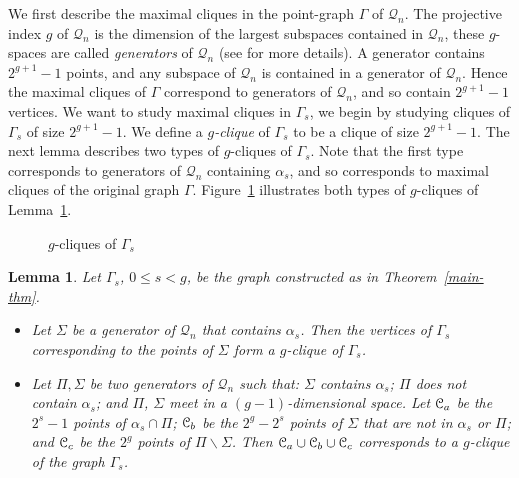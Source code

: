 \documentclass[12pt]{article}
\newtheorem{lemma}[theorem]{Lemma}
\newcommand\C{{\cal C}}
\newcommand\E{{\cal E}}
\renewcommand{\P}{\mathcal P}
\renewcommand{\H}{\mathcal H}
\newcommand{\Q}{\mathscr Q}
\renewcommand\setminus{\backslash}
\newcommand{\Label}{\label}
\begin{document}
We first describe the maximal cliques in the  point-graph $\Gamma$ of $\Q_n$. The projective index $g$ of $\Q_n$ is the dimension of the  largest subspaces  contained in $\Q_n$, these $g$-spaces  are called {\em generators} of $\Q_n$ (see \cite[Chapter 22]{HT} for more details). A generator contains $2^{g+1}-1$ points, and  any subspace of $\Q_n$ is contained in a generator of $\Q_n$. Hence the maximal cliques of $\Gamma$ correspond to generators of  $\Q_n$, and so contain
 $2^{g+1}-1$ vertices. 
% 
% 
We want to study 
maximal cliques in $\Gamma_s$,  we begin by studying cliques of  $\Gamma_s$ of size $2^{g+1}-1$.
We define a {\em $g$-clique} of $\Gamma_s$ to be a clique of size $2^{g+1}-1$.
The next lemma describes two types of $g$-cliques of $\Gamma_s$. Note that the first type 
 corresponds to generators  of $\Q_n$ containing $\alpha_s$, and so corresponds to maximal cliques of the original graph $\Gamma$.
Figure~\ref{fig-cliques} illustrates both types of $g$-cliques of  Lemma~\ref{g-cliq-1}.


\begin{figure}[h]
\centering
%
\caption{$g$-cliques of $\Gamma_s$}\label{fig-cliques}
\end{figure}



\begin{lemma}\Label{g-cliq-1} 
Let $\Gamma_s$, $0\le s < g$, be the graph constructed as in Theorem~\ref{main-thm}.
\begin{itemize}
\item[A.]
 Let $\Sigma$ be a generator of $\Q_n$ that contains $\alpha_s$. Then the vertices of $\Gamma_s$ corresponding to the points of $\Sigma$ form a $g$-clique of $\Gamma_s$.
 \item[B.]  Let $\Pi,\Sigma$ be two generators of $\Q_n$ such that: $\Sigma$ contains $\alpha_s$; $\Pi$ does not contain $\alpha_s$; and $\Pi$, $\Sigma$ meet in a $(g-1)$-dimensional space. Let $\C_a$ be the $2^s-1$ points of $\alpha_s\cap\Pi$; $\C_b$ be the $2^g-2^s$ points of $\Sigma$ that are not in $\alpha_s$ or $\Pi$; and $\C_c$ be the $2^g$ points of $\Pi\setminus\Sigma$. Then $\C_a\cup\C_b\cup\C_c$ corresponds to a $g$-clique of the graph $\Gamma_s$.
 \end{itemize}
\end{lemma}
\end{document}
